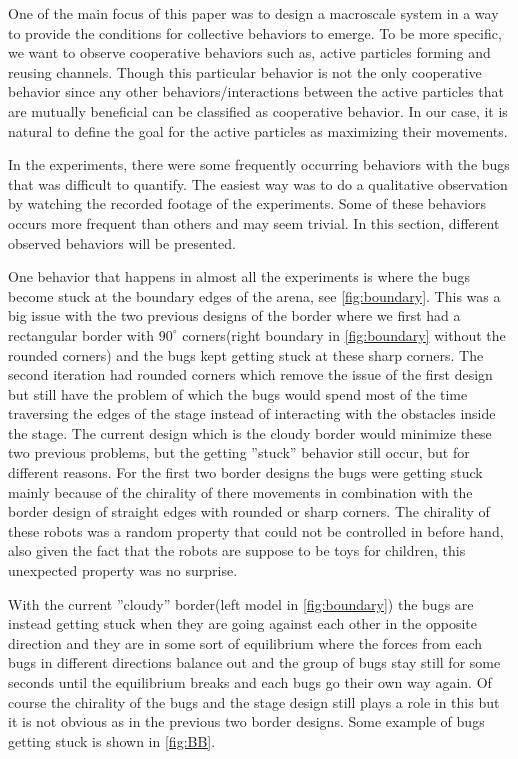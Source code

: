One of the main focus of this paper was to design a macroscale system in a way to provide the conditions for 
collective behaviors to emerge. To be more specific, we want to observe cooperative behaviors such as, 
active particles forming and reusing channels. Though this particular behavior is not the only cooperative behavior 
since any other behaviors/interactions between the active particles that are mutually beneficial can 
be classified as cooperative behavior. In our case, it is natural to define the goal for the active 
particles as maximizing their movements.

In the experiments, there were some frequently occurring behaviors with the bugs that was difficult to quantify. 
The easiest way was to do a qualitative observation by watching the recorded footage of the experiments.  
Some of these behaviors occurs more frequent than others and may seem trivial. In this section, 
different observed behaviors will be presented. 

One behavior that happens in almost all the experiments is where the bugs become stuck at the boundary edges of the 
arena, see \cref{fig:boundary}. This was a big issue with the two previous designs of the border where we first had a rectangular 
border with $90^\circ$ corners(right boundary in \cref{fig:boundary} without the rounded corners) and the bugs kept getting 
stuck at these sharp corners. The second iteration had 
rounded corners which remove the issue of the first design but still have the problem of which the bugs 
would spend most of the time traversing the edges of the stage instead of interacting with the obstacles 
inside the stage. The current design which is the cloudy border would minimize these two previous problems, 
but the getting ''stuck'' behavior still occur, but for different reasons. For the first two border designs 
the bugs were getting stuck mainly because of the chirality of there movements in combination with the border 
design of straight edges with rounded or sharp corners. The chirality of these robots was a random property that 
could not be controlled in before hand, also given the fact that the robots are suppose to be toys for children, 
this unexpected property was no surprise. 

With the current ''cloudy'' border(left model in \cref{fig:boundary}) the bugs are instead 
getting stuck when they are going against each other in the opposite direction and they are in some sort 
of equilibrium where the forces from each bugs in different directions balance out and the group of bugs stay still 
for some seconds until the equilibrium breaks and each bugs go their own way again. Of course the chirality of the 
bugs and the stage design still plays a role in this but it is not obvious as in the previous two border designs. 
Some example of bugs getting stuck is shown in \cref{fig:BB}.


